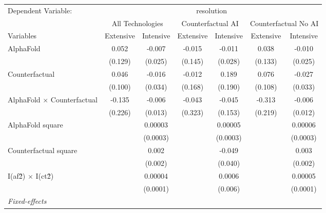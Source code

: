 \begingroup
\centering
\begin{tabular}{lcccccc}
   \tabularnewline \midrule \midrule
   Dependent Variable: & \multicolumn{6}{c}{resolution}\\
 & \multicolumn{2}{c}{All Technologies} & \multicolumn{2}{c}{Counterfactual AI} & \multicolumn{2}{c}{Counterfactual No AI} \\
\cmidrule(lr){1-1}\cmidrule(lr){2-3} \cmidrule(lr){4-5} \cmidrule(lr){6-7}
Variables & \multicolumn{1}{c}{Extensive} & \multicolumn{1}{c}{Intensive} & \multicolumn{1}{c}{Extensive} & \multicolumn{1}{c}{Intensive} & \multicolumn{1}{c}{Extensive} & \multicolumn{1}{c}{Intensive} \\
\cmidrule(lr){1-1}\cmidrule(lr){2-2} \cmidrule(lr){3-3} \cmidrule(lr){4-4} \cmidrule(lr){5-5} \cmidrule(lr){6-6} \cmidrule(lr){7-7}
   AlphaFold                          & 0.052   & -0.007   & -0.015  & -0.011   & 0.038   & -0.010\\   
                                      & (0.129) & (0.025)  & (0.145) & (0.028)  & (0.133) & (0.025)\\   
   Counterfactual                     & 0.046   & -0.016   & -0.012  & 0.189    & 0.076   & -0.027\\   
                                      & (0.100) & (0.034)  & (0.168) & (0.190)  & (0.108) & (0.033)\\   
   AlphaFold $\times$ Counterfactual  & -0.135  & -0.006   & -0.043  & -0.045   & -0.313  & -0.006\\   
                                      & (0.226) & (0.013)  & (0.323) & (0.153)  & (0.219) & (0.012)\\   
   AlphaFold square                   &         & 0.00003  &         & 0.00005  &         & 0.00006\\   
                                      &         & (0.0003) &         & (0.0003) &         & (0.0003)\\   
   Counterfactual square              &         & 0.002    &         & -0.049   &         & 0.003\\   
                                      &         & (0.002)  &         & (0.040)  &         & (0.002)\\   
   I(af\^2) $\times$ I(ct\^2)         &         & 0.00004  &         & 0.0006   &         & 0.00005\\   
                                      &         & (0.0001) &         & (0.006)  &         & (0.0001)\\   
   \midrule
   \emph{Fixed-effects}\\

\end{tabular}
